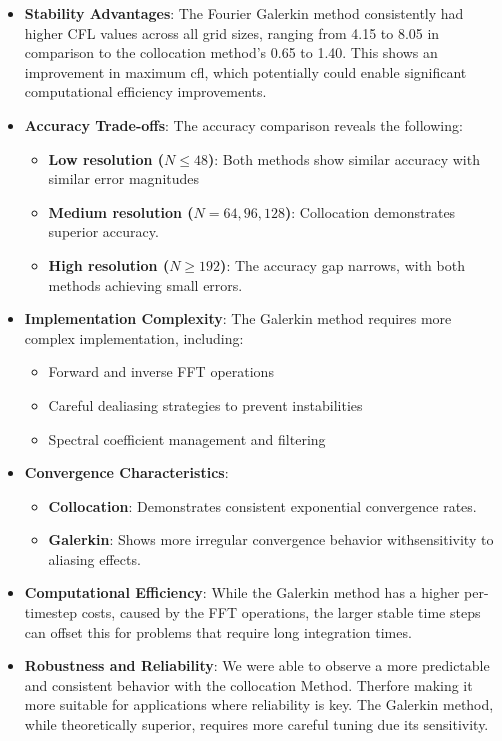 \begin{itemize}
	\item \textbf{Stability Advantages}: The Fourier Galerkin method consistently had higher CFL values across all grid sizes, ranging from 4.15 to 8.05 in comparison to the collocation method's 0.65 to 1.40. This shows an improvement in maximum cfl, which potentially could enable significant computational efficiency improvements.
	\item \textbf{Accuracy Trade-offs}: The accuracy comparison reveals the following:
	\begin{itemize}
		\item \textbf{Low resolution ($N \leq 48$)}: Both methods show similar accuracy with similar error magnitudes
		\item \textbf{Medium resolution ($N = 64, 96, 128$)}: Collocation demonstrates superior accuracy.
		\item \textbf{High resolution ($N \geq 192$)}: The accuracy gap narrows, with both methods achieving small errors.
	\end{itemize}
	\item \textbf{Implementation Complexity}: The Galerkin method requires more complex implementation, including:
	\begin{itemize}
		\item Forward and inverse FFT operations
		\item Careful dealiasing strategies to prevent instabilities
		\item Spectral coefficient management and filtering
	\end{itemize}
	
	\item \textbf{Convergence Characteristics}: 
	\begin{itemize}
		\item \textbf{Collocation}: Demonstrates consistent exponential convergence rates.
		\item \textbf{Galerkin}: Shows more irregular convergence behavior withsensitivity to aliasing effects.
	\end{itemize}
	\item \textbf{Computational Efficiency}: While the Galerkin method has a higher per-timestep costs, caused by the FFT operations, the larger stable time steps can offset this for problems that require long integration times.
	
	\item \textbf{Robustness and Reliability}: We were able to observe a more predictable and consistent behavior with the collocation Method. Therfore making it more suitable for applications where reliability is key. The Galerkin method, while theoretically superior, requires more careful tuning due its sensitivity.
\end{itemize}
